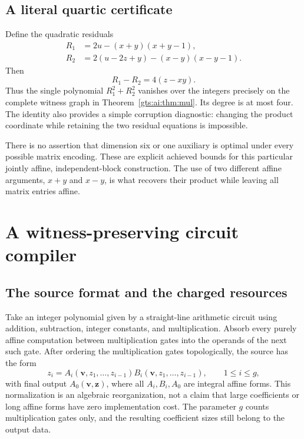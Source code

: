 \documentclass[11pt,letterpaper]{article}
\theoremstyle{definition}
\theoremstyle{remark}
\begin{document}
\subsection{A literal quartic certificate}
Define the quadratic residuals
\begin{align}
 R_1&=2u-(x+y)(x+y-1),\label{gts:ai:eq:R1}\\
 R_2&=2(u-2z+y)-(x-y)(x-y-1).\label{gts:ai:eq:R2}
\end{align}
Then
\begin{equation}\label{gts:ai:eq:difference}
 R_1-R_2=4(z-xy).
\end{equation}
Thus the single polynomial $R_1^2+R_2^2$ vanishes over the integers precisely on the complete witness graph in Theorem~\ref{gts:ai:thm:mul}. Its degree is at most four. The identity also provides a simple corruption diagnostic: changing the product coordinate while retaining the two residual equations is impossible.

There is no assertion that dimension six or one auxiliary is optimal under every possible matrix encoding. These are explicit achieved bounds for this particular jointly affine, independent-block construction. The use of two different affine arguments, $x+y$ and $x-y$, is what recovers their product while leaving all matrix entries affine.

\section{A witness-preserving circuit compiler}\label{gts:ai:sec:compiler}
\subsection{The source format and the charged resources}
Take an integer polynomial given by a straight-line arithmetic circuit using addition, subtraction, integer constants, and multiplication. Absorb every purely affine computation between multiplication gates into the operands of the next such gate. After ordering the multiplication gates topologically, the source has the form
\begin{equation}\label{gts:ai:eq:circuit}
 z_i=A_i(\mathbf v,z_1,\ldots,z_{i-1})
     B_i(\mathbf v,z_1,\ldots,z_{i-1}),\qquad 1\le i\le g,
\end{equation}
with final output $A_0(\mathbf v,\mathbf z)$, where all $A_i,B_i,A_0$ are integral affine forms. This normalization is an algebraic reorganization, not a claim that large coefficients or long affine forms have zero implementation cost. The parameter $g$ counts multiplication gates only, and the resulting coefficient sizes still belong to the output data.
\end{document}
